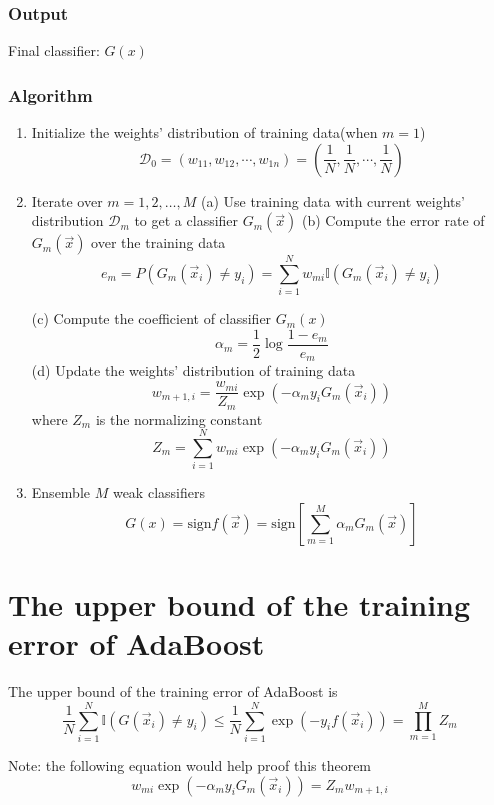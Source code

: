 \subsubsection{Output}
Final classifier: $G(x)$


\subsubsection{Algorithm}
\begin{enumerate}
\item Initialize the weights' distribution of training data(when $m=1$)
\begin{equation}\nonumber
\mathcal{D}_0=(w_{11},w_{12},\cdots,w_{1n})=(\frac{1}{N},\frac{1}{N},\cdots,\frac{1}{N})
\end{equation}
\item Iterate over $m=1,2,\dotsc,M$
\subitem (a) Use training data with current weights' distribution $\mathcal{D}_m$ to get a classifier $G_m(\vec{x})$
\subitem (b) Compute the error rate of $G_m(\vec{x})$ over the training data \\
\begin{equation}
e_m=P(G_m(\vec{x}_i)\neq y_i)=\sum_{i=1}^N {w_{mi}\mathbb{I}(G_m(\vec{x}_i) \neq y_i)}
\end{equation}

\subitem (c) Compute the coefficient of classifier $G_m(x)$
\begin{equation}
\alpha_m = \frac{1}{2}\log{\frac{1-e_m}{e_m}}
\end{equation}
\subitem (d) Update the weights' distribution of training data
\begin{equation}
w_{m+1,i}=\frac{w_{mi}}{Z_m}\exp(-\alpha_m y_i G_m(\vec{x}_i))
\end{equation}
where $Z_m$ is the normalizing constant
\begin{equation}
Z_m=\sum_{i=1}^N w_{mi}\exp(-\alpha_m y_i G_m(\vec{x}_i))
\end{equation}

\item Ensemble $M$ weak classifiers
\begin{equation}
G(x)=\text{sign}f(\vec{x})=\text{sign}\left[\sum_{m=1}^M \alpha_m G_m(\vec{x})\right]
\end{equation}
\end{enumerate} 

\section{The upper bound of the training error of AdaBoost}
\begin{theorem}
The upper bound of the training error of AdaBoost is 
\begin{equation}
\frac{1}{N} \sum_{i=1}^N \mathbb{I}(G(\vec{x}_i)\neq y_i) \leq \frac{1}{N} \sum_{i=1}^N \exp(-y_i f(\vec{x}_i))=\prod_{m=1}^M Z_m
\end{equation}

Note: the following equation would help proof this theorem
\begin{equation}
w_{mi}\exp(-\alpha_m y_i G_m(\vec{x}_i))=Z_m w_{m+1,i}
\end{equation}
\end{theorem}
